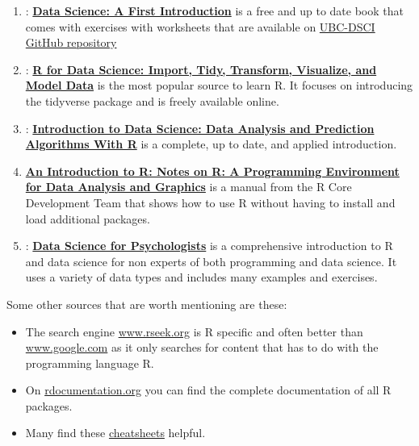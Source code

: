 \documentclass[
  12pt,
  oneside]{book}
\providecommand{\tightlist}{%
  \setlength{\itemsep}{0pt}\setlength{\parskip}{0pt}}
\theoremstyle{definition}
\theoremstyle{definition}
\theoremstyle{definition}
\theoremstyle{definition}
\theoremstyle{remark}
\begin{document}
\begin{enumerate}
\def\labelenumi{\arabic{enumi}.}
\tightlist
\item
  \citet{Timbers2022Data}: \href{https://datasciencebook.ca/}{\textbf{Data Science: A First Introduction}} is a free and up to date book that comes with exercises with worksheets that are available on \href{https://github.com/UBC-DSCI/data-science-a-first-intro-worksheets}{UBC-DSCI GitHub repository}
\item
  \citet{Wickham2023R}: \href{https://r4ds.hadley.nz/}{\textbf{R for Data Science: Import, Tidy, Transform, Visualize, and Model Data}} is the most popular source to learn R. It focuses on introducing the tidyverse package and is freely available online.
\item
  \citet{Irizarry2022Introduction}: \href{http://rafalab.dfci.harvard.edu/dsbook/}{\textbf{Introduction to Data Science: Data Analysis and Prediction Algorithms With R}} is a complete, up to date, and applied introduction.
\item
  \citet{Venables2022Introduction} \href{https://cran.r-project.org/doc/manuals/r-release/R-intro.pdf}{\textbf{An Introduction to R: Notes on R: A Programming Environment for Data Analysis and Graphics}} is a manual from the R Core Development Team that shows how to use R without having to install and load additional packages.
\item
  \citet{Neth2022ds4psy}: \href{https://bookdown.org/hneth/ds4psy/}{\textbf{Data Science for Psychologists}} is a comprehensive introduction to R and data science for non experts of both programming and data science. It uses a variety of data types and includes many examples and exercises.
\end{enumerate}

Some other sources that are worth mentioning are these:

\begin{itemize}
\tightlist
\item
  The search engine \href{http://www.rseek.org}{www.rseek.org} is R specific and often better than \href{http://www.google.com}{www.google.com} as it only searches for content that has to do with the programming language R.
\item
  On \href{http://www.rdocumentation.org}{rdocumentation.org} you can find the complete documentation of all R packages.
\item
  Many find these \href{https://posit.co/resources/cheatsheets/}{cheatsheets} helpful.
\end{itemize}
\end{document}
